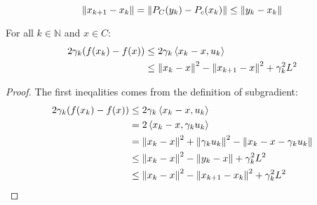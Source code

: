\begin{lemma}
    \begin{equation*}
        \left\lVert x_{k+1} - x_k\right\rVert = \left\lVert P_C(y_k) - P_c(x_k)\right\rVert \le \left\lVert y_k - x_k\right\rVert
    \end{equation*}
\end{lemma}

\begin{lemma}
    For all $k\in \mathbb{N}$ and $x \in C$:
    \begin{equation*}
    \begin{aligned}
        2\gamma_k(f(x_k) - f(x)) &\le 2\gamma_k\left\langle x_k - x, u_k \right\rangle \\
        &\le \left\lVert x_k-x\right\rVert^2 - \left\lVert x_{k+1}-x\right\rVert^2 + \gamma_k^2L^2
    \end{aligned}
    \end{equation*}
\end{lemma}
\begin{proof}
    The first ineqalities comes from the definition of subgradient:
    \begin{equation*}
    \begin{aligned}
        2\gamma_k(f(x_k) - f(x)) &\le 2\gamma_k\left\langle x_k - x, u_k \right\rangle \\
        & = 2\left\langle x_k - x, \gamma_k u_k \right\rangle \\
        &= \left\lVert x_k-x\right\rVert^2 + \left\lVert\gamma_ku_k\right\rVert^2 -\left\lVert x_k - x - \gamma_ku_k\right\rVert \\
        &\le\left\lVert x_k-x\right\rVert^2 -\left\lVert y_k - x\right\rVert + \gamma_k^2L^2 \\
        &\le\left\lVert x_k-x\right\rVert^2 - \left\lVert x_{k+1}-x_k\right\rVert^2 + \gamma^2_kL^2
    \end{aligned}    
    \end{equation*}
\end{proof}

